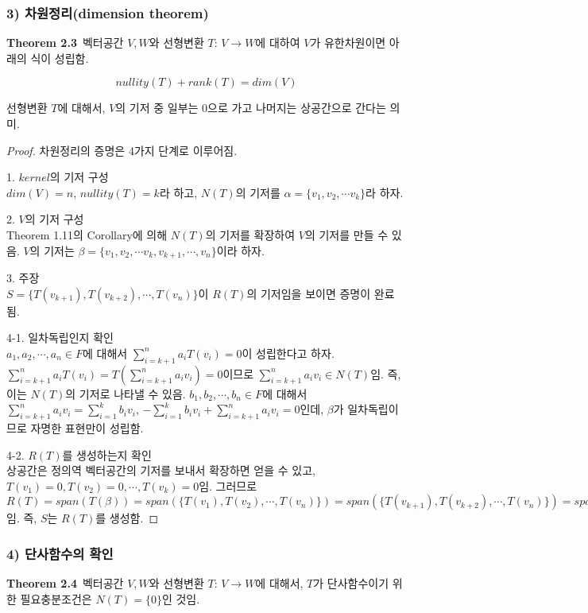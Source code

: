 \newpage


\subsubsection*{3) 차원정리(dimension theorem)}
\textbf{Theorem 2.3}\, 벡터공간 $V,W$와 선형변환 $T:\,V \rightarrow W$에 대하여 $V$가 유한차원이면 아래의 식이 성립함.

\[
nullity(T)+rank(T)=dim(V)
\]

선형변환 $T$에 대해서, $V$의 기저 중 일부는 0으로 가고 나머지는 상공간으로 간다는 의미.

\begin{proof}
차원정리의 증명은 4가지 단계로 이루어짐.

1. $kernel$의 기저 구성\\
$dim(V)=n$, $nullity(T)=k$라 하고, $N(T)$의 기저를 $\alpha = \{ v_1,v_2, \cdots v_k \}$라 하자.

2. $V$의 기저 구성\\
Theorem 1.11의 Corollary에 의해 $N(T)$의 기저를 확장하여 $V$의 기저를 만들 수 있음. $V$의 기저는 $\beta = \{ v_1,v_2, \cdots v_k,v_{k+1}, \cdots ,v_n \}$이라 하자.

3. 주장\\
$S=\{ T(v_{k+1}),T(v_{k+2}), \cdots ,T(v_n) \}$이 $R(T)$의 기저임을 보이면 증명이 완료됨.

4-1. 일차독립인지 확인\\
$a_1,a_2, \cdots ,a_n \in F$에 대해서 $\sum_{i=k+1}^{n}{a_{i}T(v_{i})}=0$이 성립한다고 하자. $\sum_{i=k+1}^{n}{a_{i}T(v_{i})}=T(\sum_{i=k+1}^{n}{a_{i}v_{i}})=0$이므로 $\sum_{i=k+1}^{n}{a_{i}v_{i}} \in N(T)$임. 즉, 이는 $N(T)$의 기저로 나타낼 수 있음. $b_1,b_2, \cdots ,b_n \in F$에 대해서 $\sum_{i=k+1}^{n}{a_{i}v_{i}}=\sum_{i=1}^{k}{b_{i}v_{i}}$, $-\sum_{i=1}^{k}{b_{i}v_{i}} + \sum_{i=k+1}^{n}{a_{i}v_{i}}=0$인데, $\beta$가 일차독립이므로 자명한 표현만이 성립함.

4-2. $R(T)$를 생성하는지 확인\\
상공간은 정의역 벡터공간의 기저를 보내서 확장하면 얻을 수 있고, $T(v_{1})=0,T(v_{2})=0, \cdots ,T(v_k)=0$임. 그러므로 $R(T)=span(T(\beta))=span(\{ T(v_{1}),T(v_{2}), \cdots ,T(v_n) \})=span(\{ T(v_{k+1}),T(v_{k+2}), \cdots ,T(v_n) \})=span(S)$임. 즉, $S$는 $R(T)$를 생성함.
\end{proof}

\subsubsection*{4) 단사함수의 확인}
\textbf{Theorem 2.4}\, 벡터공간 $V,W$와 선형변환 $T:\,V \rightarrow W$에 대해서, $T$가 단사함수이기 위한 필요충분조건은 $N(T)=\{0\}$인 것임.

